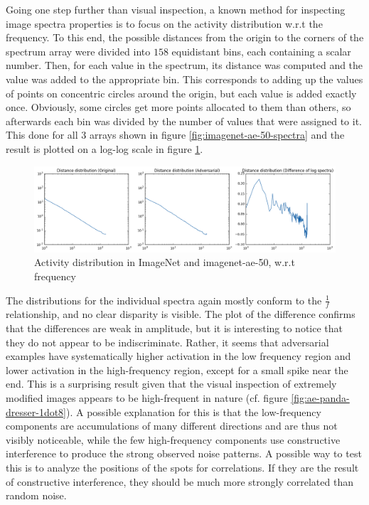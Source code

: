 \documentclass[11pt, a4paper]{article}
\begin{document}
Going one step further than visual inspection, a known method for inspecting image spectra properties is to focus on the activity distribution w.r.t the frequency. To this end, the possible distances from the origin to the corners of the spectrum array were divided into $158$ equidistant bins, each containing a scalar number. Then, for each value in the spectrum, its distance was computed and the value was added to the appropriate bin. This corresponds to adding up the values of points on concentric circles around the origin, but each value is added exactly once. Obviously, some circles get more points allocated to them than others, so afterwards each bin was divided by the number of values that were assigned to it. This done for all 3 arrays shown in figure \ref{fig:imagenet-ae-50-spectra} and the result is plotted on a log-log scale in figure \ref{fig:imagenet-ae-50-frequency}.

\begin{figure}[h!tb]
	\centering
	\includegraphics[width=\textwidth]{images/spectra/imagenet-ae-50-minconfidence-0dot5-maxorig-20000-distance-158-bins.png}
	\caption[Log spectra of ImageNet and adversarial examples, frequency analysis]{Activity distribution in ImageNet and imagenet-ae-50, w.r.t frequency}
	\label{fig:imagenet-ae-50-frequency}
\end{figure}

The distributions for the individual spectra again mostly conform to the $\frac{1}{f}$ relationship, and no clear disparity is visible. The plot of the difference confirms that the differences are weak in amplitude, but it is interesting to notice that they do not appear to be indiscriminate. Rather, it seems that adversarial examples have systematically higher activation in the low frequency region and lower activation in the high-frequency region, except for a small spike near the end. This is a surprising result given that the visual inspection of extremely modified images appears to be high-frequent in nature (cf. figure \ref{fig:ae-panda-dresser-1dot8}). A possible explanation for this is that the low-frequency components are accumulations of many different directions and are thus not visibly noticeable, while the few high-frequency components use constructive interference to produce the strong observed noise patterns. A possible way to test this is to analyze the positions of the spots for correlations. If they are the result of constructive interference, they should be much more strongly correlated than random noise.
\end{document}
